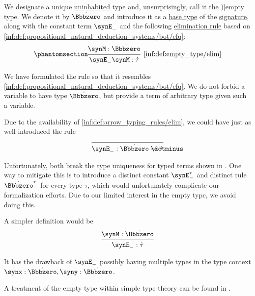 \begin{definition}\label{def:empty_type}\mimprovised
  We designate a unique \hyperref[def:type_habitation]{uninhabited} type and, unsurprisingly, call it the \term[en=empty type (\cite[\S 4.3.4]{Mimram2020ProgramEqualsProof})]{empty type}. We denote it by \( \syn\Bbbzero \) and introduce it as a \hyperref[def:simple_type]{base type} of the \hyperref[def:simple_type_signature]{signature}, along with the constant term \( \synE_- \) and the following \hyperref[rem:type_theory_rule_classification/elimination]{elimination rule} based on \ref{inf:def:propositional_natural_deduction_systems/bot/efq}:
  \begin{equation*}\taglabel[\ensuremath{ \Bbbzero_- }]{inf:def:empty_type/elim}
    \begin{prooftree}
      \hypo{ \synM: \syn\Bbbzero }
      \infer1[\ref{inf:def:empty_type/elim}]{ \synE_- \synM: \syn\tau }
    \end{prooftree}
  \end{equation*}
\end{definition}
\begin{comments}
  \item We have formulated the rule so that it resembles \ref{inf:def:propositional_natural_deduction_systems/bot/efq}. We do not forbid a variable to have type \( \syn\Bbbzero \), but provide a term of arbitrary type given such a variable.

  Due to the availability of \ref{inf:def:arrow_typing_rules/elim}, we could have just as well introduced the rule
  \begin{equation*}
    \begin{prooftree}
      \infer0{ \synE_-: \syn\Bbbzero \synimplies \syn\tau }
    \end{prooftree}
  \end{equation*}

  Unfortunately, both break the type uniqueness for typed terms shown in . One way to mitigate this is to introduce a distinct constant \( \synE_-^\tau \) and distinct rule \( \syn\Bbbzero_-^\tau \) for every type \( \tau \), which would unfortunately complicate our formalization efforts. Due to our limited interest in the empty type, we avoid doing this.

  \item A simpler definition would be
  \begin{equation*}
    \begin{prooftree}
      \hypo{ \synM: \syn\Bbbzero }
      \infer1{ \synE_-: \syn\tau }
    \end{prooftree}
  \end{equation*}

  It has the drawback of \( \synE_- \) possibly having multiple types in the type context \( \synx: \syn\Bbbzero, \syny: \syn\Bbbzero \).

  \item A treatment of the empty type within simple type theory can be found in \cite[\S 4.3.4]{Mimram2020ProgramEqualsProof}.
\end{comments}


